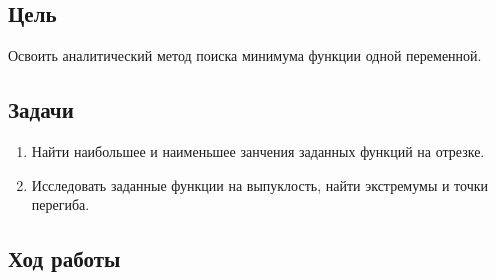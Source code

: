  



\newcommand{\labn}{1}


\subsection*{Цель}

Освоить аналитический метод поиска минимума функции одной переменной.

\subsection*{Задачи}

\begin{enumerate}
    \item Найти наибольшее и наименьшее занчения заданных функций на отрезке.
    \item Исследовать заданные функции на выпуклость, найти экстремумы и точки перегиба.
\end{enumerate}

\subsection*{Ход работы}

